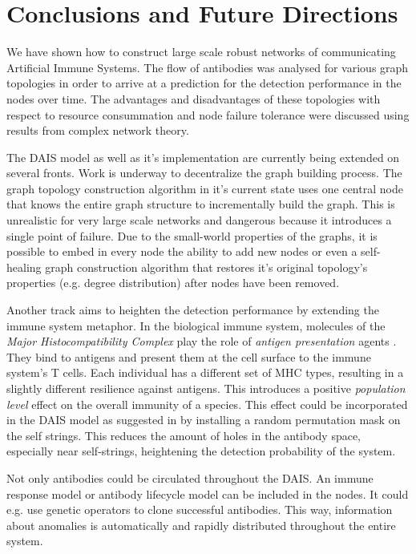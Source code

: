 \documentclass{article}
\begin{document}
\section{Conclusions and Future Directions}
\label{sec_conclusion}
We have shown how to construct large scale robust networks of communicating Artificial Immune Systems.
The flow of antibodies was analysed for various graph topologies in order to arrive at a prediction for the detection performance in the nodes over time.
The advantages and disadvantages of these topologies with respect to resource consummation and node failure tolerance were discussed using results from complex network theory.

The DAIS model as well as it's implementation are currently being extended on several fronts.
Work is underway to decentralize the graph building process.
The graph topology construction algorithm in it's current state uses one central node that knows the entire graph structure to incrementally build the graph. 
This is unrealistic for very large scale networks and dangerous because it introduces a single point of failure.
Due to the small-world properties of the graphs, it is possible to embed in every node the ability to add new nodes or even a self-healing graph construction algorithm that restores it's original topology's properties (e.g. degree distribution) after nodes have been removed.

Another track aims to heighten the detection performance by extending the immune system metaphor. 
In the biological immune system, molecules of the {\it Major Histocompatibility Complex} play the role of {\it antigen presentation} agents \cite{parham}.
They bind to antigens and present them at the cell surface to the immune system's T cells.
Each individual has a different set of MHC types, resulting in a slightly different resilience against antigens.
This introduces a positive {\it population level} effect on the overall immunity of a species.
This effect could be incorporated in the DAIS model as suggested in \cite{hofmeyr_architecture} by installing a random permutation mask on the self strings.
This reduces the amount of holes \cite{dhaeseleer_algorithms} in the antibody space, especially near self-strings, heightening the detection probability of the system.

Not only antibodies could be circulated throughout the DAIS.
An immune response model or antibody lifecycle model \cite{hofmeyr_architecture} can be included in the nodes.
It could e.g. use genetic operators to clone successful antibodies.
This way, information about anomalies is automatically and rapidly distributed throughout the entire system.
\end{document}
